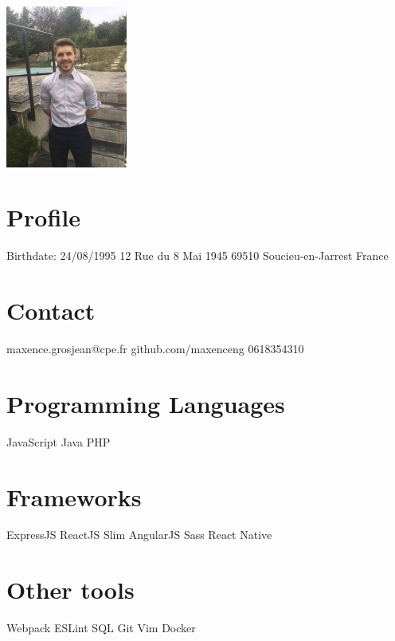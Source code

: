 \documentclass[english]{cv-style}          %
\begin{document}
\lastupdated


\begin{aside}
\includegraphics[width=4cm]{photo}
\section{Profile}
Birthdate: 24/08/1995
12 Rue du 8 Mai 1945
69510 Soucieu-en-Jarrest
France
%
\section{Contact}
maxence.grosjean@cpe.fr
github.com/maxenceng
0618354310
%
\section{Programming Languages}
JavaScript
Java
PHP
%
\section{Frameworks}
ExpressJS
ReactJS
Slim
AngularJS
Sass
React Native
%
\section{Other tools}
Webpack
ESLint
SQL
Git
Vim
Docker
%
\end{aside}

\end{document}
